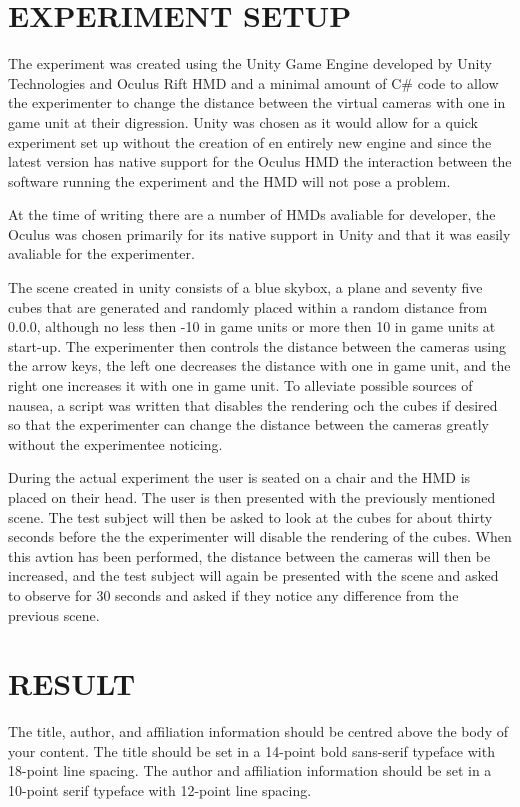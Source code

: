 \documentclass[tog]{acmsiggraph}
\begin{document}
\section{EXPERIMENT SETUP}

The experiment was created using the Unity Game Engine developed by Unity Technologies and Oculus Rift HMD and a minimal amount of C\# code to allow the experimenter to change the distance between the virtual cameras with one in game unit at their digression. Unity was chosen as it would allow for a quick experiment set up without the creation of en entirely new engine and since the latest version has native support for the Oculus HMD the interaction between the software running the experiment and the HMD will not pose a problem.

At the time of writing there are a number of HMDs avaliable for developer, the Oculus was chosen primarily for its native support in Unity and that it was easily avaliable for the experimenter.

The scene created in unity consists of a blue skybox, a plane and seventy five cubes that are generated and randomly placed within a random distance from 0.0.0, although no less then -10 in game units or  more then 10 in game units at start-up. The experimenter then controls the distance between the cameras using the arrow keys, the left one decreases the distance with one in game unit, and the right one increases it with one in game unit. To alleviate possible sources of nausea, a script was written that disables the rendering och the cubes if desired so that the experimenter can change the distance between the cameras greatly without the experimentee noticing. 

During the actual experiment the user is seated on a chair and the HMD is placed on their head. The user is then presented with the previously mentioned scene. The test subject will then be asked to look at the cubes for about thirty seconds before the the experimenter will disable the rendering of the cubes. When this avtion has been performed, the distance between the cameras will then be increased, and the test subject will again be presented with the scene and asked to observe for 30 seconds and asked if they notice any difference from the previous scene.  

\section{RESULT}

The title, author, and affiliation information should be centred
above the body of your content. The title should be set in a 14-point
bold sans-serif typeface with 18-point line spacing. The author and
affiliation information should be set in a 10-point serif typeface
with 12-point line spacing.
\end{document}
